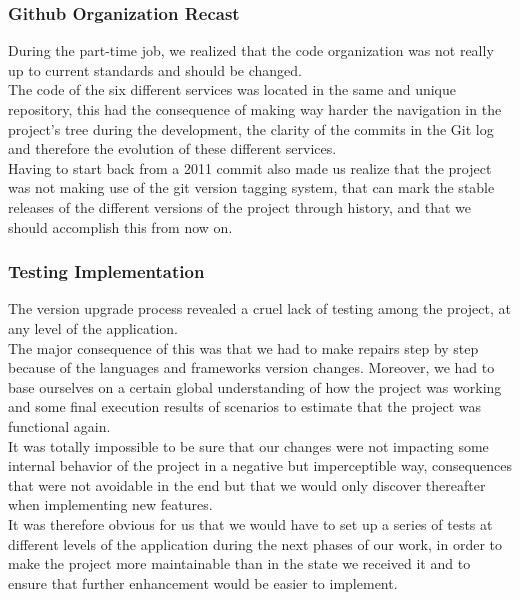\documentclass{eplmastersthesis}
\begin{document}
        \subsubsection{Github Organization Recast}

          During the part-time job, we realized that the code organization
          was not really up to current standards and should be changed.\\
          The code of the six different services was located in the same and
          unique repository, this had the consequence of making way harder
          the navigation in the project's tree during the development, the
          clarity of the commits in the Git log and therefore the evolution
          of these different services.\\

          Having to start back from a 2011 commit also made us realize that the
          project was not making use of the git version tagging system, that
          can mark the stable releases of the different versions of the project
          through history, and that we should accomplish this from now on.

        \subsubsection{Testing Implementation}

          The version upgrade process revealed a cruel lack of testing among
          the project, at any level of the application.\\
          The major consequence of this was that we had to make repairs
          step by step because of the languages and frameworks version changes.
          Moreover, we had to base ourselves on a certain global understanding
          of how the project was working and some final execution results of
          scenarios to estimate that the project was functional again.\\

          It was totally impossible to be sure that our changes were not
          impacting some internal behavior of the project in a negative but
          imperceptible way, consequences that were not avoidable in the end
          but that we would only discover thereafter when implementing new
          features.\\
          It was therefore obvious for us that we would have to set up a series
          of tests at different levels of the application during the next
          phases of our work, in order to make the project more maintainable
          than in the state we received it and to ensure that further
          enhancement would be easier to implement.
\end{document}
